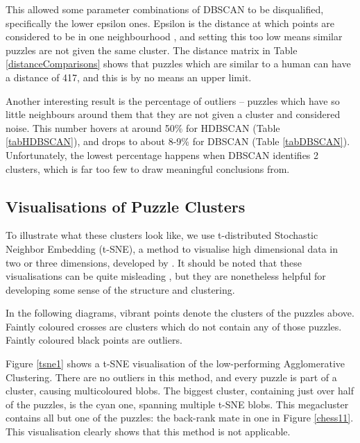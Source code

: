 This allowed some parameter combinations of DBSCAN to be disqualified,
specifically the lower epsilon ones. Epsilon is the distance at which points
are considered to be in one neighbourhood \citep{dbscan}, and setting this too
low means similar puzzles are not given the same cluster. The distance matrix
in Table \ref{distanceComparisons} shows that puzzles which are similar to a
human can have a distance of 417, and this is by no means an upper limit.

Another interesting result is the percentage of outliers -- puzzles which have
so little neighbours around them that they are not given a cluster and
considered noise. This number hovers at around 50\% for HDBSCAN (Table
\ref{tabHDBSCAN}), and drops to about 8-9\% for DBSCAN (Table \ref{tabDBSCAN}).
Unfortunately, the lowest percentage happens when DBSCAN identifies 2 clusters,
which is far too few to draw meaningful conclusions from.

\subsection{Visualisations of Puzzle Clusters}\label{treeS23}

To illustrate what these clusters look like, we use t-distributed Stochastic
Neighbor Embedding (t-SNE), a method to visualise high dimensional data in two
or three dimensions, developed by \citet{tsne}. It should be noted that these
visualisations can be quite misleading \citep{wattenberg2016how}, but they are
nonetheless helpful for developing some sense of the structure and clustering.

In the following diagrams, vibrant points denote the clusters of the puzzles
above. Faintly coloured crosses are clusters which do not contain any of those
puzzles. Faintly coloured black points are outliers.

Figure \ref{tsne1} shows a t-SNE visualisation of the low-performing
Agglomerative Clustering. There are no outliers in this method, and every
puzzle is part of a cluster, causing multicoloured blobs. The biggest cluster,
containing just over half of the puzzles, is the cyan one, spanning multiple
t-SNE blobs. This megacluster contains all but one of the puzzles: the
back-rank mate in one in Figure \ref{chess11}. This visualisation clearly shows
that this method is not applicable.


